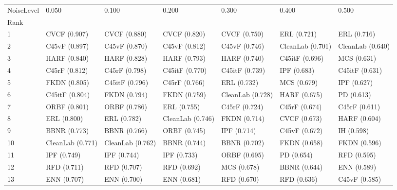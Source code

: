 \begin{tabular}{lllllll}
\toprule
NoiseLevel &             0.050 &             0.100 &             0.200 &             0.300 &             0.400 &             0.500 \\
Rank &                   &                   &                   &                   &                   &                   \\
\midrule
1    &      CVCF (0.907) &      CVCF (0.880) &      CVCF (0.820) &      CVCF (0.750) &       ERL (0.721) &       ERL (0.716) \\
2    &     C45vF (0.897) &     C45vF (0.870) &     C45vF (0.812) &     C45vF (0.746) &  CleanLab (0.701) &  CleanLab (0.640) \\
3    &      HARF (0.840) &      HARF (0.828) &      HARF (0.793) &      HARF (0.740) &    C45itF (0.696) &       MCS (0.631) \\
4    &     C45rF (0.812) &     C45rF (0.798) &    C45itF (0.770) &    C45itF (0.739) &       IPF (0.683) &    C45itF (0.631) \\
5    &      FKDN (0.805) &    C45itF (0.796) &     C45rF (0.766) &       ERL (0.732) &       MCS (0.679) &       IPF (0.627) \\
6    &    C45itF (0.804) &      FKDN (0.794) &      FKDN (0.759) &  CleanLab (0.728) &      HARF (0.675) &        PD (0.613) \\
7    &      ORBF (0.801) &      ORBF (0.786) &       ERL (0.755) &     C45rF (0.724) &     C45rF (0.674) &     C45rF (0.611) \\
8    &       ERL (0.800) &       ERL (0.782) &  CleanLab (0.746) &      FKDN (0.714) &      CVCF (0.673) &      HARF (0.604) \\
9    &      BBNR (0.773) &      BBNR (0.766) &      ORBF (0.745) &       IPF (0.714) &     C45vF (0.672) &        IH (0.598) \\
10   &  CleanLab (0.771) &  CleanLab (0.762) &      BBNR (0.744) &      BBNR (0.702) &      FKDN (0.658) &      FKDN (0.596) \\
11   &       IPF (0.749) &       IPF (0.744) &       IPF (0.733) &      ORBF (0.695) &        PD (0.654) &       RFD (0.595) \\
12   &       RFD (0.711) &       RFD (0.707) &       RFD (0.692) &       MCS (0.678) &      BBNR (0.644) &       ENN (0.589) \\
13   &       ENN (0.707) &       ENN (0.700) &       ENN (0.681) &       RFD (0.670) &       RFD (0.636) &     C45vF (0.585) \\

\end{tabular}
